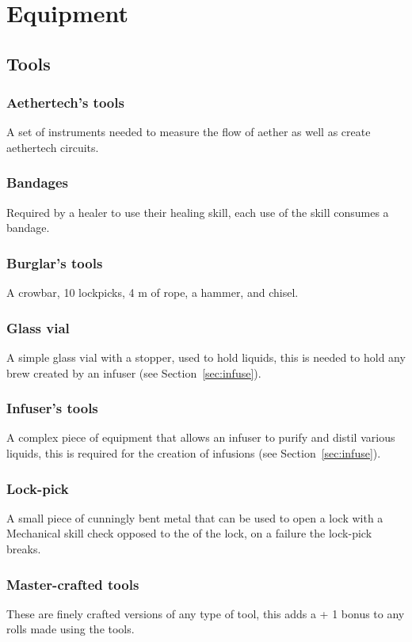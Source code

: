 \documentclass[a4paper,11pt,oneside]{book}
\newcommand{\textlf}[1]{\textbf{\titlecap{#1}}}
\begin{document}
\section{Equipment}
\subsection{Tools}

\subsubsection{Aethertech's tools}
A set of instruments needed to measure the flow of aether as well as create aethertech circuits.

\subsubsection{Bandages}
Required by a healer to use their healing skill, each use of the skill consumes a bandage.

\subsubsection{Burglar's tools}
A crowbar, 10 lockpicks, 4 m of rope, a hammer, and chisel.

\subsubsection{Glass vial}
A simple glass vial with a stopper, used to hold liquids, this is needed to hold any brew created by an infuser (see Section~\ref{sec:infuse}).

\subsubsection{Infuser's tools}
A complex piece of equipment that allows an infuser to purify and distil various liquids, this is required for the creation of infusions (see Section~\ref{sec:infuse}).

\subsubsection{Lock-pick}
A small piece of cunningly bent metal that can be used to open a lock with a Mechanical skill check opposed to the \textlf{difficulty} of the lock, on a failure the lock-pick breaks.

\subsubsection{Master-crafted tools}
These are finely crafted versions of any type of tool, this adds a + 1 bonus to any rolls made using the tools.
\end{document}
